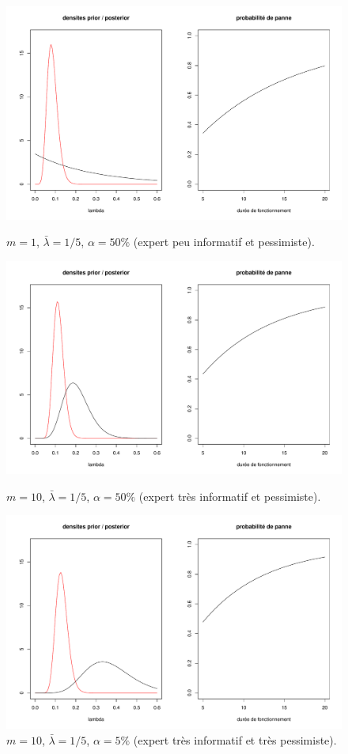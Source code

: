 \begin{figure}[h!]
\centering
\includegraphics[scale=0.4]{figures/prior/figure01.pdf} 
\caption{$m=1$, $\bar{\lambda}=1/5$, $\alpha=50\%$ (expert peu informatif et pessimiste).}
\label{expert1}
\includegraphics[scale=0.4]{figures/prior/figure02.pdf} 
\caption{$m=10$, $\bar{\lambda}=1/5$, $\alpha=50\%$ (expert très informatif et pessimiste).} \label{expert2}
\includegraphics[scale=0.4]{figures/prior/figure03.pdf} 
\caption{$m=10$, $\bar{\lambda}=1/5$, $\alpha=5\%$ (expert très informatif et très pessimiste).} \label{expert3}
\end{figure}

